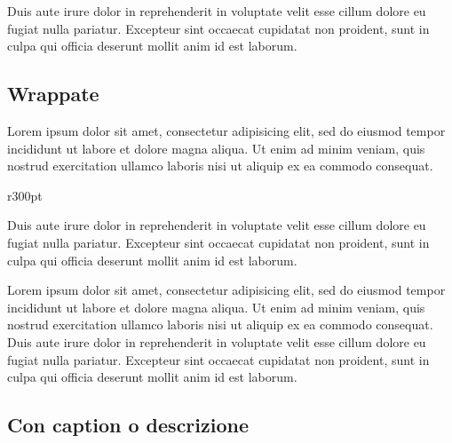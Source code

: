 \documentclass[a4paper, 12pt]{report}
\begin{document}
\begin{figure}[h]
	\centering
\end{figure}

Duis aute irure dolor in reprehenderit in voluptate velit esse
cillum dolore eu fugiat nulla pariatur. Excepteur sint occaecat cupidatat non
proident, sunt in culpa qui officia deserunt mollit anim id est laborum.

\subsection*{Wrappate}

Lorem ipsum dolor sit amet, consectetur adipisicing elit, sed do eiusmod
tempor incididunt ut labore et dolore magna aliqua. Ut enim ad minim veniam,
quis nostrud exercitation ullamco laboris nisi ut aliquip ex ea commodo consequat.

\begin{wrapfigure}{r}{300pt}
	\centering
	\vspace{-1.5\baselineskip}
	\vspace{-2.5\baselineskip}
\end{wrapfigure}

Duis aute irure dolor in reprehenderit in voluptate velit esse
cillum dolore eu fugiat nulla pariatur. Excepteur sint occaecat cupidatat non
proident, sunt in culpa qui officia deserunt mollit anim id est laborum.

Lorem ipsum dolor sit amet, consectetur adipisicing elit, sed do eiusmod
tempor incididunt ut labore et dolore magna aliqua. Ut enim ad minim veniam,
quis nostrud exercitation ullamco laboris nisi ut aliquip ex ea commodo
consequat. Duis aute irure dolor in reprehenderit in voluptate velit esse
cillum dolore eu fugiat nulla pariatur. Excepteur sint occaecat cupidatat non
proident, sunt in culpa qui officia deserunt mollit anim id est laborum.

\subsection*{Con caption o descrizione}
\end{document}

